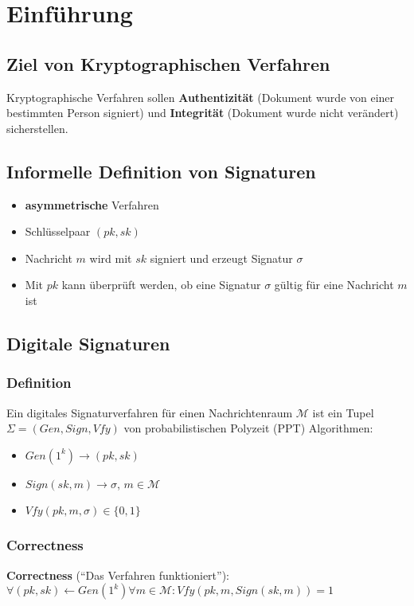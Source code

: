\documentclass[12pt,A4]{extarticle}
\newcommand{\highlight}[1]{\textcolor{highlightColor}{\textbf{#1}}}
\begin{document}
\disclaimer

\tableofcontents
\clearpage

\section{Einführung}
\subsection{Ziel von Kryptographischen Verfahren}
Kryptographische Verfahren sollen \highlight{Authentizität} (Dokument wurde von einer bestimmten Person signiert) und \highlight{Integrität} (Dokument wurde nicht verändert) sicherstellen.

\subsection{Informelle Definition von Signaturen}
\begin{itemize}
  \item{\textbf{asymmetrische} Verfahren}
  \item{Schlüsselpaar $(pk, sk)$}
  \item{Nachricht $m$ wird mit $sk$ signiert und erzeugt Signatur $\sigma$}
  \item{Mit $pk$ kann überprüft werden, ob eine Signatur $\sigma$ gültig für eine Nachricht $m$ ist}
\end{itemize}

\subsection{Digitale Signaturen}
\subsubsection{Definition}
Ein digitales Signaturverfahren für einen Nachrichtenraum $\mathcal{M}$ ist ein Tupel $\Sigma = (Gen, Sign, Vfy)$ von probabilistischen Polyzeit (PPT) Algorithmen:
\begin{itemize}
  \item{$Gen(1^k) \rightarrow (pk, sk)$}
  \item{$Sign(sk, m) \rightarrow \sigma$, $m \in \mathcal{M}$}
  \item{$Vfy(pk, m, \sigma) \in \{0, 1\}$}
\end{itemize}

\subsubsection{Correctness}
\highlight{Correctness} (``Das Verfahren funktioniert''): $\forall (pk, sk) \leftarrow Gen(1^k) \forall m \in \mathcal{M}: Vfy(pk, m, Sign(sk, m)) = 1$
\end{document}

